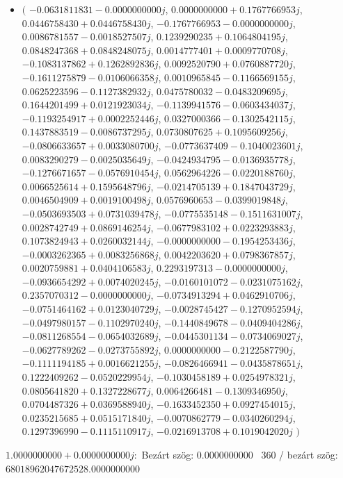 \documentclass[14pt,a4paper]{article}
\begin{document}
\begin{itemize}
\item
$\big($
$-0.0631811831-0.0000000000j$, $0.0000000000+0.1767766953j$, $0.0446758430+0.0446758430j$, $-0.1767766953-0.0000000000j$, $0.0086781557-0.0018527507j$, $0.1239290235+0.1064804195j$, $0.0848247368+0.0848248075j$, $0.0014777401+0.0009770708j$, $-0.1083137862+0.1262892836j$, $0.0092520790+0.0760887720j$, $-0.1611275879-0.0106066358j$, $0.0010965845-0.1166569155j$, $0.0625223596-0.1127382932j$, $0.0475780032-0.0483209695j$, $0.1644201499+0.0121923034j$, $-0.1139941576-0.0603434037j$, $-0.1193254917+0.0002252446j$, $0.0327000366-0.1302542115j$, $0.1437883519-0.0086737295j$, $0.0730807625+0.1095609256j$, $-0.0806633657+0.0033080700j$, $-0.0773637409-0.1040023601j$, $0.0083290279-0.0025035649j$, $-0.0424934795-0.0136935778j$, $-0.1276671657-0.0576910454j$, $0.0562964226-0.0220188760j$, $0.0066525614+0.1595648796j$, $-0.0214705139+0.1847043729j$, $0.0046504909+0.0019100498j$, $0.0576960653-0.0399019848j$, $-0.0503693503+0.0731039478j$, $-0.0775535148-0.1511631007j$, $0.0028742749+0.0869146254j$, $-0.0677983102+0.0223293883j$, $0.1073824943+0.0260032144j$, $-0.0000000000-0.1954253436j$, $-0.0003262365+0.0083256868j$, $0.0042203620+0.0798367857j$, $0.0020759881+0.0404106583j$, $0.2293197313-0.0000000000j$, $-0.0936654292+0.0074020245j$, $-0.0160101072-0.0231075162j$, $0.2357070312-0.0000000000j$, $-0.0734913294+0.0462910706j$, $-0.0751464162+0.0123040729j$, $-0.0028745427-0.1270952594j$, $-0.0497980157-0.1102970240j$, $-0.1440849678-0.0409404286j$, $-0.0811268554-0.0654032689j$, $-0.0445301134-0.0734069027j$, $-0.0627789262-0.0273755892j$, $0.0000000000-0.2122587790j$, $-0.1111194185+0.0016621255j$, $-0.0826466941-0.0435878651j$, $0.1222409262-0.0520229954j$, $-0.1030458189+0.0254978321j$, $0.0805641820+0.1327228677j$, $0.0064266481-0.1309346950j$, $0.0704487326+0.0369588940j$, $-0.1633452350+0.0927454015j$, $0.0235215685+0.0515171840j$, $-0.0070862779-0.0340260294j$, $0.1297396990-0.1115110917j$, $-0.0216913708+0.1019042020j$
$\big)$
\end{itemize}
$1.0000000000+0.0000000000j$:\
Bezárt szög: $0.0000000000$ \
360 / bezárt szög: $68018962047672528.0000000000$\
\end{document}
